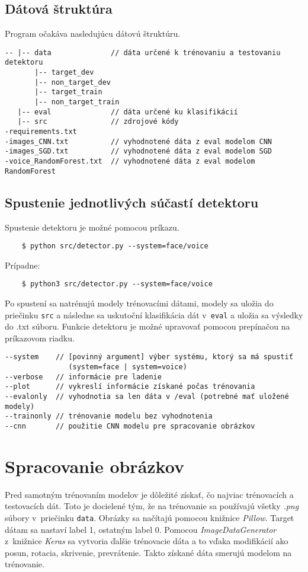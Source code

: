 \documentclass[11pt, a4paper]{article}
\begin{document}
		\subsection{Dátová štruktúra}
	Program očakáva nasledujúcu dátovú štruktúru.
			\begin{verbatim}
-- |-- data              // dáta určené k trénovaniu a testovaniu detektoru
       |-- target_dev
       |-- non_target_dev
       |-- target_train
       |-- non_target_train
   |-- eval              // dáta určené ku klasifikácií
   |-- src               // zdrojové kódy 
-requirements.txt
-images_CNN.txt	         // vyhodnotené dáta z eval modelom CNN
-images_SGD.txt	         // vyhodnotené dáta z eval modelom SGD
-voice_RandomForest.txt	 // vyhodnotené dáta z eval modelom RandomForest

			\end{verbatim}
			
		\subsection{Spustenie jednotlivých súčastí detektoru}
	Spustenie detektoru je možné pomocou príkazu.
			\begin{verbatim}
    $ python src/detector.py --system=face/voice
			\end{verbatim}
	Prípadne:
			\begin{verbatim}
    $ python3 src/detector.py --system=face/voice
			\end{verbatim}
	Po spustení sa natrénujú modely trénovacími dátami, modely sa uložia do priečinku \texttt{src} a následne sa uskutoční klasifikácia dát v~\texttt{eval} a uložia sa výsledky do .txt súboru.
	Funkcie detektoru je možné upravovať pomocou prepínačou na príkazovom riadku.
			
			\begin{verbatim}
--system    // [povinný argument] výber systému, ktorý sa má spustiť 
               (system=face | system=voice)	
--verbose   // informácie pre ladenie
--plot      // vykreslí informácie získané počas trénovania 
--evalonly  // vyhodnotia sa len dáta v /eval (potrebné mať uložené modely)
--trainonly // trénovanie modelu bez vyhodnotenia
--cnn       // použitie CNN modelu pre spracovanie obrázkov
			\end{verbatim}
			
	\section{Spracovanie obrázkov}
		Pred samotným trénovaním modelov je dôležité získať, čo najviac trénovacích a testovacích dát. Toto je docielené tým, že na trénovanie sa používajú všetky \emph{.png} súbory v~priečinku \texttt{data}. Obrázky sa načítajú pomocou knižnice \emph{Pillow}. Target dátam sa nastaví label 1, ostatným label 0. Pomocou \emph{ImageDataGenerator} z~knižnice \emph{Keras} sa vytvoria ďalšie trénovacie dáta a to vďaka modifikácií ako posun, rotacia, skrivenie, prevrátenie. Takto získané dáta smerujú modelom na trénovanie. 
		
\end{document}

